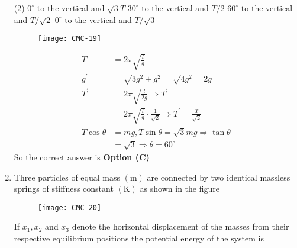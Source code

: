 \begin{enumerate}
\begin{tasks}(2)
\task[\textbf{A.}]  $0^{\circ}$ to the vertical and $\sqrt{3} T$
\task[\textbf{B.}] $30^{\circ}$ to the vertical and $T / 2$
\task[\textbf{C.}] $60^{\circ}$ to the vertical and $T / \sqrt{2}$
\task[\textbf{D.}] $0^{\circ}$ to the vertical and $T / \sqrt{3}$
\end{tasks}
\begin{answer}
\begin{figure}[H]
	\centering
	\texttt{[image: CMC-19]}
\end{figure}
\begin{align*}
T&=2 \pi \sqrt{\frac{l}{g}}\\
g^{\prime}&=\sqrt{3 g^{2}+g^{2}}=\sqrt{4 g^{2}}=2 g\\
T^{\prime}&=2 \pi \sqrt{\frac{l}{2 g}} \Rightarrow T^{\prime}\\&=2 \pi \sqrt{\frac{l}{g}} \cdot \frac{1}{\sqrt{2}} \Rightarrow T^{\prime}=\frac{T}{\sqrt{2}}\\
T \cos \theta&=m g, T \sin \theta=\sqrt{3} m g \Rightarrow \tan \theta\\&=\sqrt{3} \Rightarrow \theta=60^{\circ}
\end{align*}
So the correct answer is \textbf{Option (C)}
\end{answer}
\item Three particles of equal mass $(\mathrm{m})$ are connected by two identical massless springs of stiffness constant $(\mathrm{K})$ as shown in the figure\\
\begin{figure}[H]
	\centering
	\texttt{[image: CMC-20]}
\end{figure}
If $x_{1}, x_{2}$ and $x_{3}$ denote the horizontal displacement of the masses from their respective equilibrium positions the potential energy of the system is


\end{enumerate}
